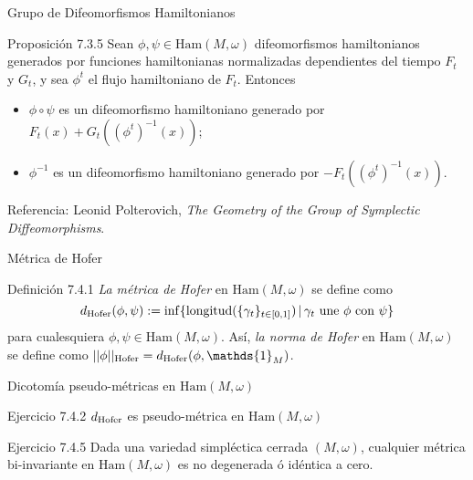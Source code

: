 \documentclass{beamer}
\newcounter{Ejercicio}
\renewcommand{\d}{d}
\newcommand{\mrm}{\mathrm}
\newcommand{\Ham}{\mrm{Ham}}
\begin{document}
\begin{frame}{Grupo de Difeomorfismos Hamiltonianos}
\begin{block}{Proposición 7.3.5}
Sean $\phi, \psi \in \Ham(M, \omega)$ difeomorfismos hamiltonianos generados por funciones hamiltonianas normalizadas dependientes del tiempo $F_t$ y $G_t$, y sea $\phi^t$ el flujo hamiltoniano de $F_t$. Entonces\pause
\begin{itemize}
\item[(1)] $\phi \circ \psi$ es un difeomorfismo hamiltoniano generado por $F_t(x) + G_t((\phi^t)^{-1}(x))$;\pause
\item[(2)] $\phi^{-1}$ es un difeomorfismo hamiltoniano generado por $-F_t((\phi^t)^{-1}(x))$.\pause
\end{itemize}


 \end{block}
Referencia: Leonid Polterovich, \textit{The Geometry of the Group of Symplectic Diffeomorphisms}.
\end{frame}

\begin{frame}{Métrica de Hofer}
\begin{block}{Definición 7.4.1}
{\it La métrica de Hofer} en $\Ham(M, \omega)$ se define como \pause
\[ \d_{\rm Hofer}(\phi, \psi) : = \inf\{{\rm longitud}(\{\gamma_t\}_{t \in [0,1]}) \,| \, \mbox{$\gamma_t$ une $\phi$ con $\psi$}\} \]
para cualesquiera $\phi, \psi \in \Ham(M, \omega)$. \pause Así, {\it la norma de Hofer} en $\Ham(M,\omega)$ se define como $||\phi||_{\rm Hofer} = \d_{\rm Hofer}(\phi, \mathds{1}_M)$.


 \end{block}
\end{frame}

\begin{frame}{Dicotomía pseudo-métricas en $\Ham(M, \omega)$}
\begin{block}{Ejercicio 7.4.2}
$\d_{\rm Hofer}$ es pseudo-métrica en $\Ham(M, \omega)$ \pause


 \end{block}


  \begin{block}{Ejercicio 7.4.5}
Dada una variedad simpléctica cerrada $(M, \omega)$, cualquier métrica bi-invariante en $\Ham(M, \omega)$ es no degenerada ó idéntica a cero.



 \end{block}

\end{frame}
\end{document}
